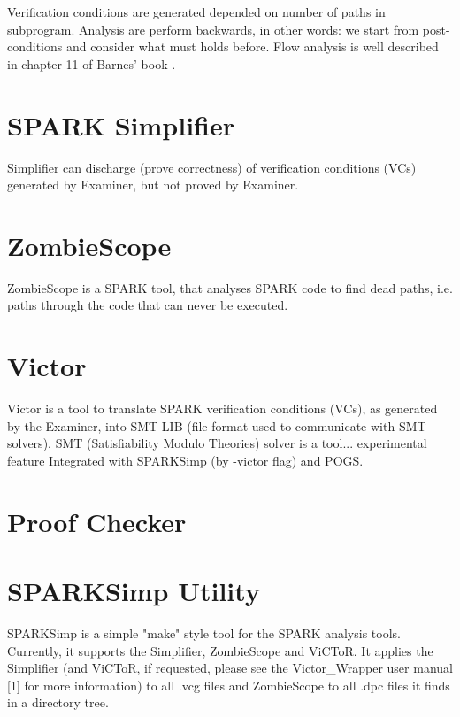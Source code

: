 Verification conditions are generated depended on number of paths in subprogram. Analysis are perform backwards, in other words: we start from post-conditions and consider what must holds before. Flow analysis is well described in chapter 11 of Barnes' book \cite{Barnes:Book}.



\section{SPARK Simplifier}
\label{verification:simplifier}

Simplifier can discharge (prove correctness) of verification conditions (VCs) generated by Examiner, but not proved by Examiner. \cite{Simplifier:Online} 



\section{ZombieScope}
\label{verification:zombiescope}

ZombieScope is a SPARK tool, that analyses SPARK code to find dead paths, i.e. paths through the code that can never be executed.


\section{Victor}
\label{verification:victor}

Victor is a tool to translate SPARK verification conditions (VCs), as generated by the Examiner, into SMT-LIB (file format used to communicate with SMT solvers). \cite{Victor:Online} SMT (Satisfiability Modulo Theories) solver is a tool...
experimental feature
Integrated with SPARKSimp (by -victor flag) and POGS.


\section{Proof Checker}
\label{verification:proofchecker}



\section{SPARKSimp Utility}
\label{verification:sparksimp}
SPARKSimp is a simple "make" style tool for the SPARK analysis tools. Currently, it supports the Simplifier, ZombieScope and ViCToR. It applies the Simplifier (and ViCToR, if requested, please see the Victor_Wrapper user manual [1] for more information) to all .vcg files and ZombieScope to all .dpc files it finds in a directory tree. \cite{SPARKSimp:Online} 



